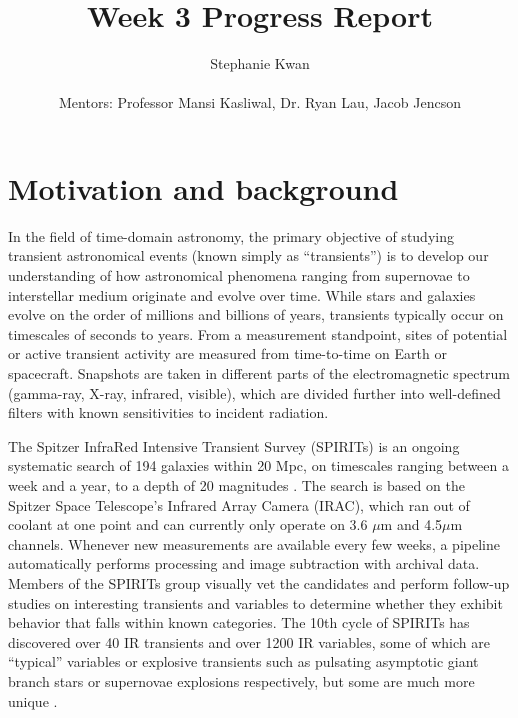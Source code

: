\documentclass{article}
\title{Week 3 Progress Report}
\author{Stephanie Kwan \\
\\
Mentors: Professor Mansi Kasliwal, Dr. Ryan Lau, Jacob Jencson
}
\begin{document}
\maketitle
\pagestyle{fancy}

\section{Motivation and background}
In the field of time-domain astronomy, the primary objective of studying transient astronomical events (known simply as ``transients'') is to develop our understanding of how astronomical phenomena ranging from supernovae to interstellar medium originate and evolve over time. While stars and galaxies evolve on the order of millions and billions of years, transients typically occur on timescales of seconds to years. From a measurement standpoint, sites of potential or active transient activity are measured from time-to-time on Earth or spacecraft. Snapshots are taken in different parts of the electromagnetic spectrum (gamma-ray, X-ray, infrared, visible), which are divided further into well-defined filters with known sensitivities to incident radiation. 


The Spitzer InfraRed Intensive Transient Survey (SPIRITs) is an ongoing systematic search of 194 galaxies within 20 Mpc, on timescales ranging between a week and a year, to a depth of 20 magnitudes \cite{SPIRITS proposal}. The search is based on the Spitzer Space Telescope's Infrared Array Camera (IRAC), which ran out of coolant at one point and can currently only operate on 3.6 $\mu$m and 4.5$\mu$m channels. Whenever new measurements are available every few weeks, a pipeline automatically performs processing and image subtraction with archival data. Members of the SPIRITs group visually vet the candidates and perform follow-up studies on interesting transients and variables to determine whether they exhibit behavior that falls within known categories. The 10th cycle of SPIRITs has discovered over 40 IR transients and over 1200 IR variables, some of which are ``typical'' variables or explosive transients such as pulsating asymptotic giant branch stars or supernovae explosions respectively, but some are much more unique \cite{Email}. 


\end{document}
